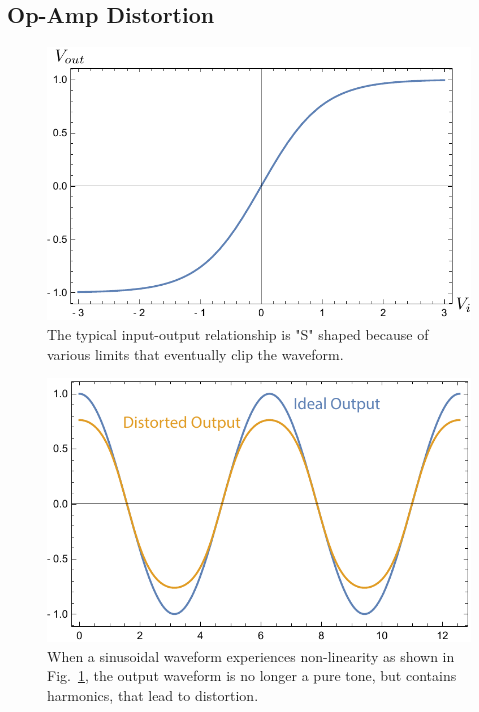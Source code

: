 \subsection{Op-Amp Distortion}
\begin{figure}[tb]
\centering
\includegraphics[width=.75\columnwidth]{vtanh}
\caption{The typical input-output relationship is "S" shaped because of various limits that eventually clip the waveform.}
\label{fig:vtanh}
\end{figure}
\begin{figure}[tb]
\centering
\includegraphics[width=.75\columnwidth]{vdisto}
\caption{When a sinusoidal waveform experiences non-linearity as shown in Fig.~\ref{fig:vtanh}, the output waveform is no longer a pure tone, but contains harmonics, that lead to distortion.}
\label{fig:vdisto}
\end{figure}
